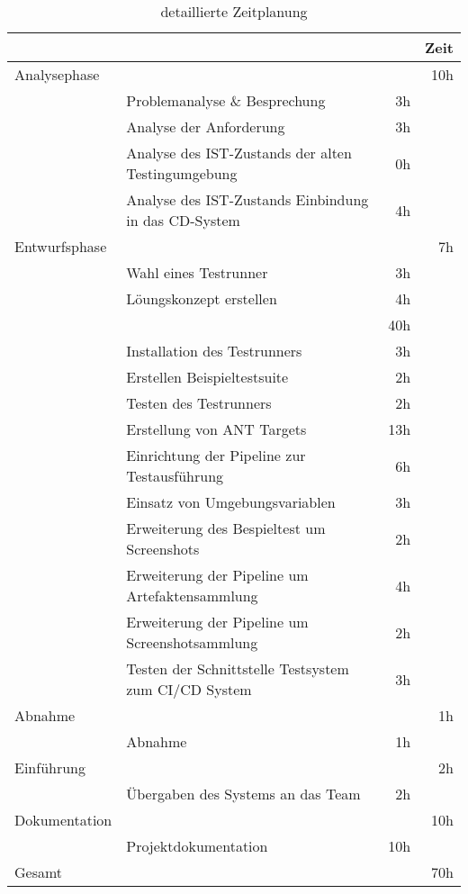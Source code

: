 \begin{table}[h]
\begin{tabular}{llrr}
\rowcolor{gragreen}\multicolumn{1}{l}{\bf{Projektphase}} & \multicolumn{1}{l}{ } & \multicolumn{1}{l}{\bf{ }} & \multicolumn{1}{l}{\bf{Zeit}} \\
\hline
\rowcolor{heading}Analysephase &  &  & 10h \\
 & Problemanalyse \& Besprechung & 3h &  \\
\rowcolor{odd} & Analyse der Anforderung & 3h &  \\
& Analyse des IST-Zustands der alten Testingumgebung & 0h &  \\
 \rowcolor{odd}& Analyse des IST-Zustands Einbindung in das CD-System & 4h &  \\
\rowcolor{heading}Entwurfsphase &  &  & 7h \\
 & Wahl eines Testrunner & 3h &  \\
 \rowcolor{odd} & Löungskonzept erstellen & 4h &  \\
\rowcolor{heading}\multicolumn{2}{l}{Implementierungsphase}   &  & 40h \\
 & Installation des Testrunners & 3h &  \\
 \rowcolor{odd}& Erstellen Beispieltestsuite & 2h &  \\
 & Testen des Testrunners & 2h &  \\
\rowcolor{odd} & Erstellung von ANT Targets & 13h &  \\
 & Einrichtung der Pipeline zur Testausführung & 6h &  \\
\rowcolor{odd} & Einsatz von Umgebungsvariablen & 3h &  \\
 & Erweiterung des Bespieltest um Screenshots & 2h &  \\
\rowcolor{odd} & Erweiterung der Pipeline um Artefaktensammlung & 4h &  \\
 & Erweiterung der Pipeline um Screenshotsammlung & 2h &  \\
\rowcolor{odd} & Testen der Schnittstelle Testsystem zum CI/CD System & 3h &  \\
\rowcolor{heading}Abnahme &  &  & 1h \\
 & Abnahme & 1h &  \\
\rowcolor{heading}Einführung &  &  & 2h \\
 & Übergaben des Systems an das Team & 2h &  \\
\rowcolor{heading}Dokumentation &  &  & 10h \\
 & Projektdokumentation & 10h & \\
\hline
\rowcolor{heading}Gesamt &  &  & 70h
\end{tabular}
\caption{detaillierte Zeitplanung}
\label{table:detailtimetable}
\end{table}